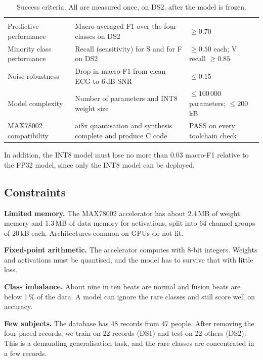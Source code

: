 \begin{table}[H]
  \centering
  \caption{Success criteria. All are measured once, on DS2, after the model is frozen.}
  \label{tab:success-criteria}
  \begin{tabularx}{\linewidth}{l Y Y}
     &  &  \\
    Predictive performance     & Macro-averaged F1 over the four classes on DS2 & $\geq 0.70$ \\
    Minority class performance & Recall (sensitivity) for S and for F on DS2     & $\geq 0.50$ each; V recall $\geq 0.85$ \\
    Noise robustness           & Drop in macro-F1 from clean ECG to 6\,dB SNR   & $\leq 0.15$ \\
    Model complexity           & Number of parameters and INT8 weight size      & $\leq 100\,000$ parameters; $\leq 200$\,kB \\
    MAX78002 compatibility     & ai8x quantisation and synthesis complete and produce C code & PASS on every toolchain check \\
    \bottomrule
  \end{tabularx}

\end{table}

In addition, the INT8 model must lose no more than 0.03 macro-F1 relative to the FP32 model, since only the INT8 model can be deployed.

\subsection{Constraints}

\textbf{Limited memory.} The MAX78002 accelerator has about 2.4\,MB of weight memory and 1.3\,MB of data memory for activations, split into 64 channel groups of 20\,kB each. Architectures common on GPUs do not fit.

\textbf{Fixed-point arithmetic.} The accelerator computes with 8-bit integers. Weights and activations must be quantised, and the model has to survive that with little loss.

\textbf{Class imbalance.} About nine in ten beats are normal and fusion beats are below 1\,\% of the data. A model can ignore the rare classes and still score well on accuracy.

\textbf{Few subjects.} The database has 48 records from 47 people. After removing the four paced records, we train on 22 records (DS1) and test on 22 others (DS2). This is a demanding generalisation task, and the rare classes are concentrated in a few records.

